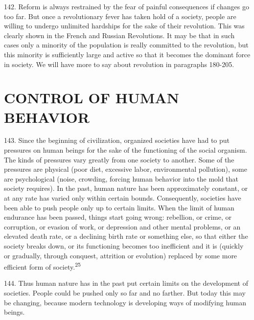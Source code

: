 \documentclass{article}
\begin{document}
142. Reform is always restrained by the fear of painful consequences if changes go too far. But 
once a revolutionary fever has taken hold of a society, people are willing to undergo unlimited 
hardships for the sake of their revolution. This was clearly shown in the French and Russian 
Revolutions. It may be that in such cases only a minority of the population is really committed to 
the revolution, but this minority is sufficiently large and active so that it becomes the dominant 
force in society. We will have more to say about revolution in paragraphs 180-205. 


\section{CONTROL OF HUMAN BEHAVIOR}

\hspace{0.5cm} 143. Since the beginning of civilization, organized societies have had to put pressures on human 
beings for the sake of the functioning of the social organism. The kinds of pressures vary greatly 
from one society to another. Some of the pressures are physical (poor diet, excessive labor, 
environmental pollution), some are psychological (noise, crowding, forcing human behavior into 
the mold that society requires). In the past, human nature has been approximately constant, or at 
any rate has varied only within certain bounds. Consequently, societies have been able to push 
people only up to certain limits. When the limit of human endurance has been passed, things start 
going wrong: rebellion, or crime, or corruption, or evasion of work, or depression and other mental 
problems, or an elevated death rate, or a declining birth rate or something else, so that either the 
society breaks down, or its functioning becomes too inefficient and it is (quickly or gradually, 
through conquest, attrition or evolution) replaced by some more efficient form of society.\textsuperscript{25} \vspace{\baselineskip}

144. Thus human nature has in the past put certain limits on the development of societies. People 
could be pushed only so far and no farther. But today this may be changing, because modern 
technology is developing ways of modifying human beings. \vspace{\baselineskip}
\end{document}
